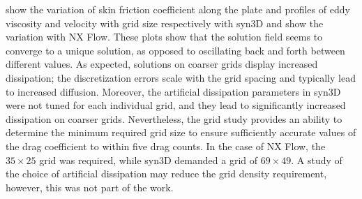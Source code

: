  show the variation of skin friction coefficient along the plate and profiles of eddy viscosity and velocity with grid size respectively with syn3D and  show the variation with NX Flow. These plots show that the solution field seems to converge to a unique solution, as opposed to oscillating back and forth between different values. As expected, solutions on coarser grids display increased dissipation; the discretization errors scale with the grid spacing and typically lead to increased diffusion. Moreover, the artificial dissipation parameters in syn3D were not tuned for each individual grid, and they lead to significantly increased dissipation on coarser grids. Nevertheless, the grid study provides an ability to determine the minimum required grid size to ensure sufficiently accurate values of the drag coefficient to within five drag counts. In the case of NX Flow, the $35\times25$ grid was required, while syn3D demanded a grid of $69\times49$. A study of the choice of artificial dissipation may reduce the grid density requirement, however, this was not part of the work.
